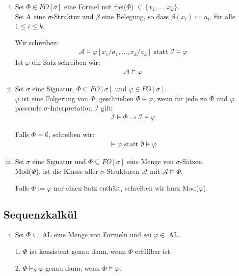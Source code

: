 \documentclass[a4paper,10pt]{article}
\begin{document}
\begin{enumerate}[(i)]
				
			\item	
				Sei $\Phi \in FO[\sigma]$ eine Formel mit frei($\Phi$) $\subseteq \{x_1,..., x_k\}$. \\
				
				Sei A eine $\sigma$-Struktur und $\beta$ eine Belegung, so dass $\beta(x_i) := a_i$, für alle $1 \leq i \leq k$.
				
				Wir schreiben:
				\begin{align*}
					\mathcal{A} \vDash \varphi[x_1/a_1,..., x_k/a_k] \text{ statt } \mathcal{I} \vDash \varphi
				\end{align*}
				Ist $\varphi$ ein Satz schreiben wir:
				\begin{align*}
					\mathcal{A} \vDash \varphi
				\end{align*}
			
			\item
				Sei $\sigma$ eine Signatur, $\Phi \subseteq FO[\sigma]$ und $\varphi \in FO[\sigma]$. \\ 
				
				$\varphi$ ist eine Folgerung von $\Phi$, geschrieben $\Phi \vDash \varphi$, wenn für jede zu $\Phi$ und $\varphi$ passende 							$\sigma$-Interpretation $\mathcal{I}$ gilt:
				\begin{align*}
					\mathcal{I} \vDash \Phi \Rightarrow \mathcal{I} \vDash \varphi
				\end{align*}
				
				Falls $\Phi = \emptyset$, schreiben wir:
				\begin{align*}
					\vDash \varphi \text{ statt } \emptyset \vDash \varphi
				\end{align*}
		
			\item
				Sei $\sigma$ eine Signatur und $\Phi \subseteq FO[\sigma]$ eine Menge von $\sigma$-Sätzen.\\
				
				Mod($\Phi$), ist die Klasse aller $\sigma$-Strukturen $\mathcal{A}$ mit $\mathcal{A} \vDash \Phi$.
				
				Falls $\Phi := {\varphi}$ nur einen Satz enthält, schreiben wir kurz Mod($\varphi$).
		\end{enumerate}
		
	\subsection*{Sequenzkalkül}
		\begin{enumerate}[(i)]
			\item
				Sei $\Phi \subseteq$ AL eine Menge von Formeln und sei $\varphi \in$ AL.
				
				1. $\Phi$ ist konsistent genau dann, wenn $\Phi$ erfüllbar ist.
				
				2. $\Phi \vdash_S \varphi$ genau dann, wenn $\Phi \vDash \varphi$.
		\end{enumerate}
\end{document}
